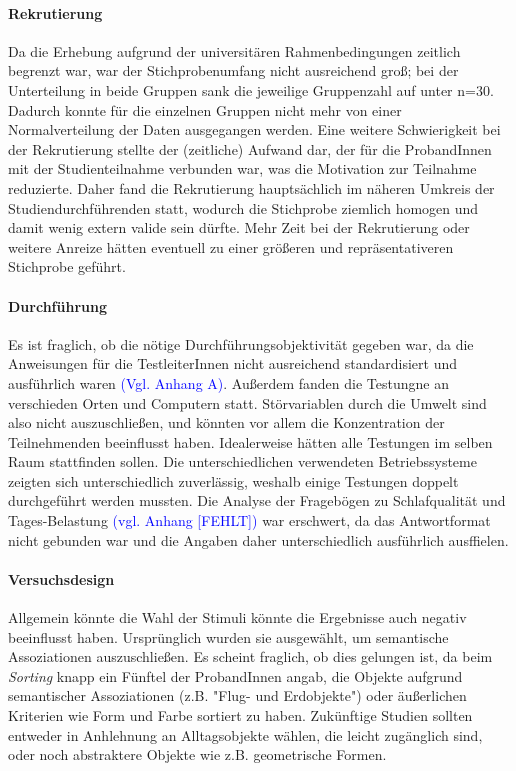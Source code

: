\paragraph{Rekrutierung}
Da die Erhebung aufgrund der universitären Rahmenbedingungen zeitlich begrenzt war, war der Stichprobenumfang nicht ausreichend groß; bei der Unterteilung in beide Gruppen sank die jeweilige Gruppenzahl auf unter n=30. Dadurch konnte für die einzelnen Gruppen nicht mehr von einer Normalverteilung der Daten ausgegangen werden. Eine weitere Schwierigkeit bei der Rekrutierung stellte der (zeitliche) Aufwand dar, der für die ProbandInnen mit der Studienteilnahme verbunden war, was die Motivation zur Teilnahme reduzierte. Daher fand die Rekrutierung hauptsächlich im näheren Umkreis der Studiendurchführenden statt, wodurch die Stichprobe ziemlich homogen und damit wenig extern valide sein dürfte. Mehr Zeit bei der Rekrutierung oder weitere Anreize hätten eventuell zu einer größeren und repräsentativeren Stichprobe geführt.

\paragraph{Durchführung}
Es ist fraglich, ob die nötige Durchführungsobjektivität gegeben war, da die Anweisungen für die TestleiterInnen nicht ausreichend standardisiert und ausführlich waren \textcolor{blue}{(Vgl. Anhang A)}. Außerdem fanden die Testungne an verschieden Orten und Computern statt. Störvariablen durch die Umwelt sind also nicht auszuschließen, und könnten vor allem die Konzentration der Teilnehmenden beeinflusst haben. Idealerweise hätten alle Testungen im selben Raum stattfinden sollen. Die unterschiedlichen verwendeten Betriebssysteme zeigten sich unterschiedlich zuverlässig, weshalb einige Testungen doppelt durchgeführt werden mussten.
Die Analyse der Fragebögen zu Schlafqualität und Tages-Belastung \textcolor{blue}{(vgl. Anhang [FEHLT])} war erschwert, da das Antwortformat nicht gebunden war und die Angaben daher unterschiedlich ausführlich ausffielen.

\paragraph{Versuchsdesign}
Allgemein könnte die Wahl der Stimuli könnte die Ergebnisse auch negativ beeinflusst haben. Ursprünglich wurden sie ausgewählt, um semantische Assoziationen auszuschließen. Es scheint fraglich, ob dies gelungen ist, da beim \textit{Sorting} knapp ein Fünftel der ProbandInnen angab, die Objekte aufgrund semantischer Assoziationen (z.B. "Flug- und Erdobjekte") oder äußerlichen Kriterien wie Form und Farbe sortiert zu haben. Zukünftige Studien sollten entweder in Anhlehnung an \citet{Garvert2017} Alltagsobjekte wählen, die leicht zugänglich sind, oder noch abstraktere Objekte wie z.B. geometrische Formen. 

